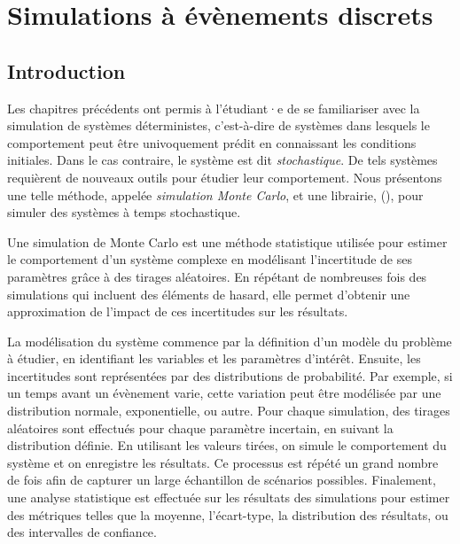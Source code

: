 \chapter{Simulations à évènements discrets}
    \section{Introduction}
        Les chapitres précédents ont permis à l'étudiant·e de se familiariser avec la simulation de systèmes déterministes, c'est-à-dire de systèmes dans lesquels le comportement peut être univoquement prédit en connaissant les conditions initiales. Dans le cas contraire, le système est dit \textit{stochastique}. De tels systèmes requièrent de nouveaux outils pour étudier leur comportement. Nous présentons une telle méthode, appelée \textit{simulation Monte Carlo}, et une librairie,  (\cite{Simpy2023}), pour simuler des systèmes à temps stochastique.
        
        Une simulation de Monte Carlo est une méthode statistique utilisée pour estimer le comportement d'un système complexe en modélisant l'incertitude de ses paramètres grâce à des tirages aléatoires. En répétant de nombreuses fois des simulations qui incluent des éléments de hasard, elle permet d'obtenir une approximation de l'impact de ces incertitudes sur les résultats. 
        
        La modélisation du système commence par la définition d'un modèle du problème à étudier, en identifiant les variables et les paramètres d'intérêt. Ensuite, les incertitudes sont représentées par des distributions de probabilité. Par exemple, si un temps avant un évènement varie, cette variation peut être modélisée par une distribution normale, exponentielle, ou autre. Pour chaque simulation, des tirages aléatoires sont effectués pour chaque paramètre incertain, en suivant la distribution définie. En utilisant les valeurs tirées, on simule le comportement du système et on enregistre les résultats. Ce processus est répété un grand nombre de fois afin de capturer un large échantillon de scénarios possibles. Finalement, une analyse statistique est effectuée sur les résultats des simulations pour estimer des métriques telles que la moyenne, l'écart-type, la distribution des résultats, ou des intervalles de confiance.
    
